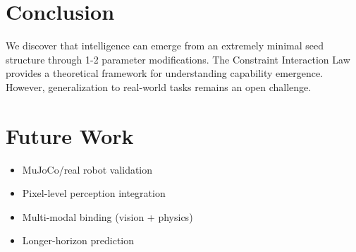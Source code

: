 \documentclass{article}
\begin{document}
\section{Conclusion}

We discover that intelligence can emerge from an extremely minimal seed structure through 1-2 parameter modifications. The Constraint Interaction Law provides a theoretical framework for understanding capability emergence. However, generalization to real-world tasks remains an open challenge.

\section{Future Work}

\begin{itemize}
\item MuJoCo/real robot validation
\item Pixel-level perception integration  
\item Multi-modal binding (vision + physics)
\item Longer-horizon prediction
\end{itemize}
\end{document}
